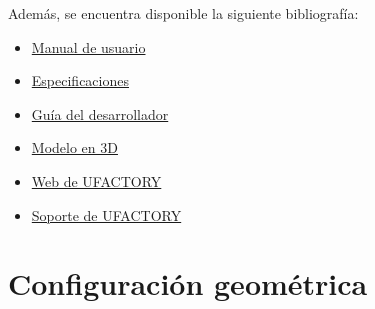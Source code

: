 \documentclass[a4paper,12pt]{article}
\begin{document}
Además, se encuentra disponible la siguiente bibliografía:
\begin{itemize}
    \item \href{https://github.com/UPM-Robotics/uarm/blob/master/docs/robot-information/uArm%20pro%20User%20Manual%20v1.1.0.pdf}{Manual de usuario}
    \item \href{https://github.com/UPM-Robotics/uarm/blob/master/docs/robot-information/uArm-Swift-Specifications-171012.pdf}{Especificaciones}
    \item \href{https://github.com/UPM-Robotics/uarm/blob/master/docs/robot-information/uArm%20Swift%20Pro_Developer%20Guide%20v1.0.6.pdf}{Guía del desarrollador}
    \item \href{https://github.com/UPM-Robotics/uarm/blob/master/docs/robot-information/uArm_Swift_Pro_3D_20180620.STEP}{Modelo en 3D}
    \item \href{https://www.ufactory.cc/#/en/}{Web de UFACTORY}
    \item \href{https://www.ufactory.cc/#/en/support/technology}{Soporte de UFACTORY}
\end{itemize}

\newpage
\section{Configuración geométrica}
\end{document}
